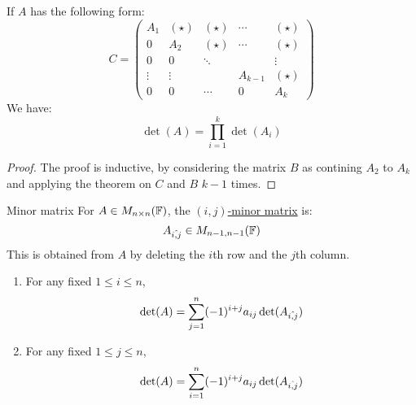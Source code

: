 \documentclass[../Main.tex]{subfiles}
\begin{document}
\begin{corollary}
    If $A$ has the following form:
    \begin{equation*}
        C =
        \begin{pmatrix}
            A_1 & (\star) & (\star) & \cdots & (\star) \\
            0 & A_2 & (\star) & \cdots & (\star) \\
            0 & 0 & \ddots & & \vdots \\
            \vdots & \vdots & & A_{k-1} & (\star) \\
            0 & 0 & \cdots & 0 & A_k
        \end{pmatrix}                
    \end{equation*}
    We have:
    \begin{equation*}
        \det(A) = \prod_{i=1}^{k} \det(A_i)
    \end{equation*}
    \label{corMultiBlockDet}
\end{corollary}
\begin{proof}
    The proof is inductive, by considering the matrix $B$ as contining $A_2$ to $A_k$ and applying the theorem on $C$ and $B$ $k-1$ times.
\end{proof}
\begin{definition}{Minor matrix}
    For $A \in M_{n \times n}(\mathbb{F})$, the \underline{$(i, j)$-minor matrix} is:
    \begin{equation*}
        {A}_{\hat{{i},{j}}} \in M_{n-1, n-1} (\mathbb{F})
    \end{equation*}
    This is obtained from $A$ by deleting the $i$th row and the $j$th column.
\end{definition}
\begin{lemma}
    \begin{enumerate}
        \item For any fixed $1 \leq i \leq n$,
            \begin{equation*}
                \det(A) = \sum_{j=1}^{n} (-1)^{i+j} a_{ij} \det({A}_{\hat{{i},{j}}})
            \end{equation*}
        \item For any fixed $1 \leq j \leq n$,
            \begin{equation*}
                \det(A) = \sum_{i=1}^{n} (-1)^{i+j} a_{ij} \det({A}_{\hat{{i},{j}}})
            \end{equation*}
    \end{enumerate}
    \label{lemLaplaceOnRowCol}
\end{lemma}
\end{document}
